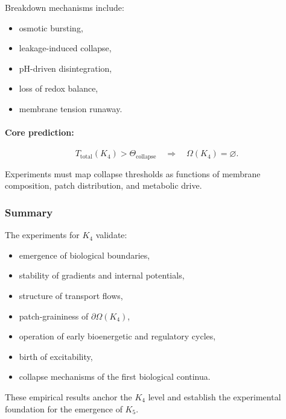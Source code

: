 Breakdown mechanisms include:

\begin{itemize}
    \item osmotic bursting,
    \item leakage-induced collapse,
    \item pH-driven disintegration,
    \item loss of redox balance,
    \item membrane tension runaway.
\end{itemize}

\paragraph{Core prediction:}

\[
   T_{\mathrm{total}}(K_4) > \Theta_{\mathrm{collapse}} 
   \quad \Rightarrow \quad
   \Omega(K_4) = \varnothing.
\]

Experiments must map collapse thresholds as functions of membrane composition, 
patch distribution, and metabolic drive.



\subsubsection{Summary}

The experiments for $K_4$ validate:

\begin{itemize}
    \item emergence of biological boundaries,
    \item stability of gradients and internal potentials,
    \item structure of transport flows,
    \item patch-graininess of $\partial\Omega(K_4)$,
    \item operation of early bioenergetic and regulatory cycles,
    \item birth of excitability,
    \item collapse mechanisms of the first biological continua.
\end{itemize}

These empirical results anchor the $K_4$ level and establish the 
experimental foundation for the emergence of $K_5$.
